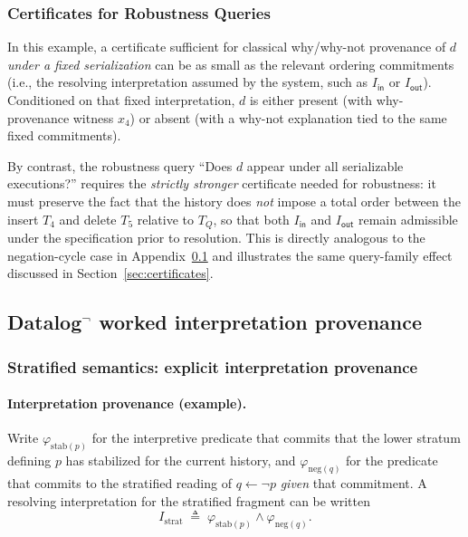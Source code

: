 \documentclass[acmsmall,nonacm]{acmart}
\theoremstyle{remark}
\numberwithin{definition}{section}
\numberwithin{theorem}{section}
\numberwithin{lemma}{section}
\numberwithin{corollary}{section}
\numberwithin{remark}{section}
\numberwithin{example}{section}
\numberwithin{observation}{section}
\numberwithin{assumption}{section}
\begin{document}
\subsubsection{Certificates for Robustness Queries}

In this example, a certificate sufficient for classical why/why-not provenance of $d$ \emph{under a fixed serialization} can be as small as the relevant ordering commitments (i.e., the resolving interpretation assumed by the system, such as $I_{\mathsf{in}}$ or $I_{\mathsf{out}}$). Conditioned on that fixed interpretation, $d$ is either present (with why-provenance witness $x_4$) or absent (with a why-not explanation tied to the same fixed commitments).

By contrast, the robustness query “Does $d$ appear under all serializable executions?” requires the
\emph{strictly stronger} certificate needed for robustness: it must preserve the fact that the history does
\emph{not} impose a total order between the insert $T_4$ and delete $T_5$ relative to $T_Q$, so that both
$I_{\mathsf{in}}$ and $I_{\mathsf{out}}$ remain admissible under the specification prior to resolution. This
is directly analogous to the negation-cycle case in Appendix~\ref{sec:appendix-datalog} and illustrates the same
query-family effect discussed in Section~\ref{sec:certificates}.

\subsection{Datalog\texorpdfstring{$^{\neg}$}{ with negation} worked interpretation provenance}
\label{sec:appendix-datalog}

\subsubsection{Stratified semantics: explicit interpretation provenance}

\paragraph{Interpretation provenance (example).}
Write $\varphi_{\mathrm{stab}(p)}$ for the interpretive predicate that commits
that the lower stratum defining $p$ has stabilized for the current history, and
$\varphi_{\mathrm{neg}(q)}$ for the predicate that commits to the stratified
reading of $q \leftarrow \neg p$ \emph{given} that commitment.
A resolving interpretation for the stratified fragment can be written
\[
  I_{\mathrm{strat}} \;\triangleq\;
  \varphi_{\mathrm{stab}(p)} \wedge \varphi_{\mathrm{neg}(q)}.
\]
\end{document}
